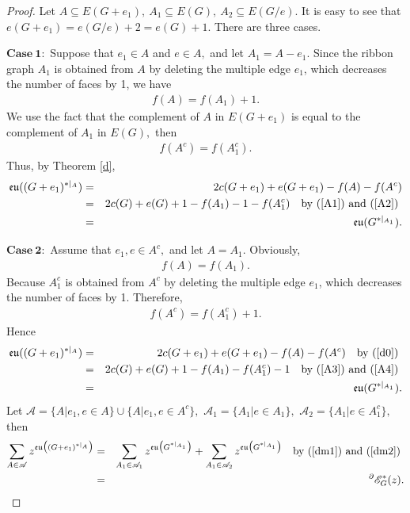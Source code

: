 \begin{proof}

Let $A\subseteq E(G+e_{1}),\ A_{1}\subseteq E(G), \  A_{2}\subseteq E(G/ e).$ It is easy to see that $e(G+e_{1})=e(G/ e)+2=e(G)+1.$     There are three cases.

$\mathbf{Case~ 1}:$ Suppose that $e_{1}\in A$ and $e\in A,$ and let $A_{1}=A-e_{1}$.   Since the ribbon graph $A_{1}$ is  obtained  from  $A$ by  deleting the multiple edge $e_{1}$, which decreases the number of faces by 1,  we have
\begin{eqnarray}\label{A1}
f(A)=f(A_{1})+1.
\end{eqnarray}  We use the fact that  the complement of $A$ in  $E(G+e_{1})$ is equal to the complement of $A_{1}$ in $E(G),$ then
\begin{eqnarray}\label{A2}
f(A^{c})=f(A_{1}^{c}).
\end{eqnarray}
 Thus, by  Theorem \ref{d},
\begin{eqnarray}\label{dm1}
{\mathfrak{eu}}((G+e_{1})^{*|_{ A}})&=&2c(G+e_{1})+e(G+e_{1})-f(A)-f(A^{c})\notag\\
&=&2c(G)+e(G)+1-f(A_{1})-1-f(A_{1}^{c})\quad \text{by (\ref{A1})~and~(\ref{A2}) }\notag\\
&=&{\mathfrak{eu}}(G^{*|_{ A_{1}}}).
\end{eqnarray}




$\mathbf{Case ~2}:$
Assume that $e_{1},e\in A^{c},$  and  let $A=A_{1}$.  Obviously,
\begin{eqnarray}\label{A3}
f(A)=f(A_{1}).
\end{eqnarray}
Because  $A^{c}_{1}$  is  obtained  from  $A^{c}$ by  deleting the multiple edge $e_{1}$, which decreases the number of faces by 1. Therefore,
\begin{eqnarray}\label{A4}
f(A^{c})=f(A^{c}_{1})+1.
\end{eqnarray}   Hence
 \begin{eqnarray}\label{dm2}
{\mathfrak{eu}}((G+e_{1})^{*|_{ A}})&=&2c(G+e_{1})+e(G+e_{1})-f(A)-f(A^{c})\quad\text{by (\ref{d0}) }\notag\\
&=&2c(G)+e(G)+1-f(A_{1})-f(A_{1}^{c})-1\quad\text{by (\ref{A3})~and~(\ref{A4}) }\notag\\
&=&{\mathfrak{eu}}(G^{*|_{ A_{1}}}).
\end{eqnarray}
 Let $\mathscr{A}=\{A|e_{1},e\in A\}\cup \{A|e_{1},e\in A^{c}\},$ $\mathscr{A}_{1}=\{A_{1}|e\in A_{1}\},$ $\mathscr{A}_{2}=\{A_{1}|e\in A^{c}_{1}\},$ then
 \begin{eqnarray}\label{dm3}
\sum\limits_{A\in\mathscr{A}}z^{{\mathfrak{eu}}\big((G+e_{1})^{*|_A}\big)} &=&\sum\limits_{A_{1}\in \mathscr{A}_{1}} z^{{\mathfrak{eu}}\big(G^{*|_{ A_{1}}}\big)}+\sum\limits_{A_{1}\in \mathscr{A}_{2}} z^{{\mathfrak{eu}}\big(G^{*|_{ A_{1}}}\big)}\quad\text{by (\ref{dm1})~and~(\ref{dm2}) }\notag\\
&=&~^{\partial}{{\mathscr{E}}}^{*}_{G}(z).
\end{eqnarray}



\end{proof}
